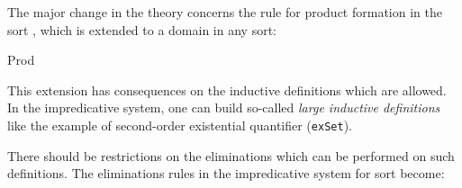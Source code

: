 The major change in the theory concerns the rule for product formation
in the sort \Set, which is extended to a domain in any sort:
\begin{description}
\item [Prod]  
\end{description}
This extension has consequences on the inductive definitions which are
allowed. 
In the impredicative system, one can build so-called {\em large inductive
  definitions} like the example of second-order existential
quantifier (\texttt{exSet}).

There should be restrictions on the eliminations which can be
performed on such definitions. The eliminations rules in the
impredicative system for sort \Set{} become:
\begin{description}
\item[\Set] 
\end{description}
     




